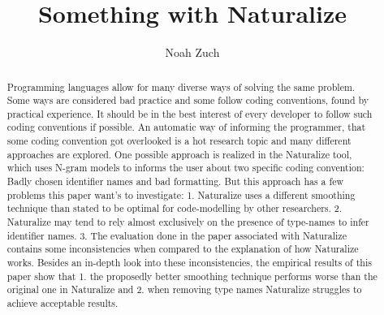 \documentclass[sigconf]{acmart}
\begin{document}
\title{Something with Naturalize}

\author{Noah Zuch}


\renewcommand{\shortauthors}{Zuch}

\begin{abstract}
  Programming languages allow for many diverse ways of solving the same problem. Some ways are considered bad practice and some follow coding conventions, found by practical experience. It should be in the best interest of every developer to follow such coding conventions if possible.
  An automatic way of informing the programmer, that some coding convention got overlooked is a hot research topic and many different approaches are explored. One possible approach is realized in the Naturalize tool, which uses N-gram models to informs the user about two specific coding convention: Badly chosen identifier names and bad formatting. But this approach has a few problems this paper want's to investigate: 1. Naturalize uses a different smoothing technique than stated to be optimal for code-modelling by other researchers. 2. Naturalize may tend to rely almost exclusively on the presence of type-names to infer identifier names. 3. The evaluation done in the paper associated with Naturalize contains some inconsistencies when compared to the explanation of how Naturalize works. Besides an in-depth look into these inconsistencies, the empirical results of this paper show that 1. the proposedly better smoothing technique performs worse than the original one in Naturalize and 2. when removing type names Naturalize struggles to achieve acceptable results.
\end{abstract}
\end{document}
